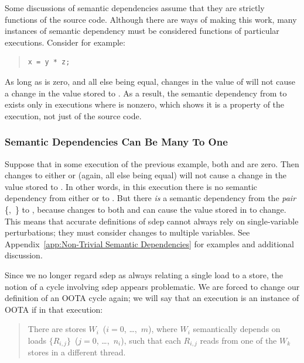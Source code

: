 \documentclass[10]{article}
\begin{document}
Some discussions of semantic dependencies assume that they
are strictly functions of the source code.
Although there are ways of making this work, many instances of
semantic dependency must be considered functions of particular executions.
Consider for example:

\begin{quote}
\begin{verbatim}
x = y * z;
\end{verbatim}
\end{quote}

\noindent
As long as  is zero, and all else being equal, changes in the
value of  will not cause a change in the value stored to .
As a result, the semantic dependency from  to  exists only
in executions where  is nonzero,
which shows it is a property of the execution, not just of the source code.

\subsubsection{Semantic Dependencies Can Be Many To One}
\label{sec:Semantic Dependencies Can Be Many To One}

Suppose that in some execution of the previous example,
both  and  are zero.
Then changes to either  or  (again, all
else being equal) will not cause a change in the value stored to .
In other words, in this execution there is no semantic dependency
from either  or  to .
But there \emph{is} a semantic dependency from the \emph{pair}
\{,~\} to ,
because changes to both  and 
can cause the value stored in  to change.
This means that accurate definitions of sdep cannot always rely on
single-variable perturbations;
they must consider changes to multiple variables.
See Appendix~\ref{app:Non-Trivial Semantic Dependencies}
for examples and additional discussion.

Since we no longer regard sdep as always relating a single load to a store,
the notion of a cycle involving sdep appears problematic.
We are forced to change our definition of an OOTA cycle again;
we will say that an execution is an instance of OOTA if in that execution:

\begin{quote}
	There are stores
	$W_i$~($i = 0$, \ldots,~$m$),
	where $W_i$ semantically depends on loads
	$\{R_{i,j}\}$~($j = 0$, \ldots,~$n_i$),
	such that each $R_{i,j}$ reads from one of the $W_k$
	stores in a different thread.
\end{quote}
\end{document}
